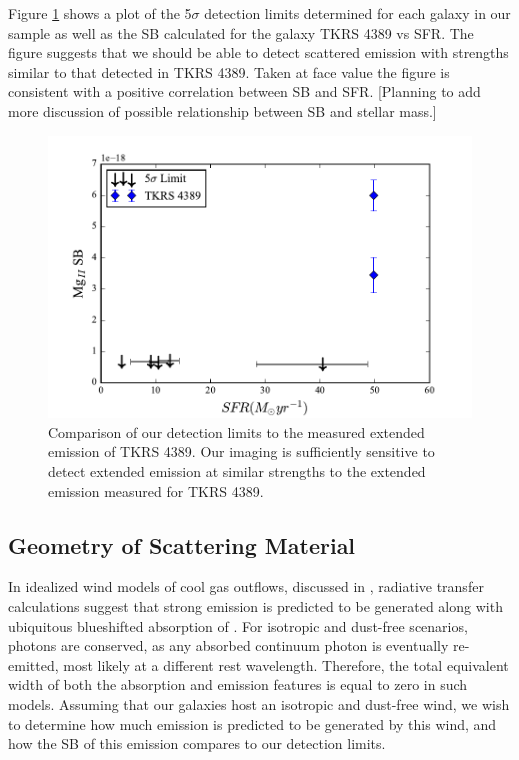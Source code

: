 \documentclass[twocolumn]{aastex61}
\begin{document}
Figure \ref{fig:detection_lim} shows a plot of the 5$\sigma$ detection limits determined for each galaxy in our sample as well as the SB calculated for the galaxy TKRS 4389 vs SFR. The figure suggests that we should be able to detect scattered  emission with strengths similar to that detected in TKRS 4389. Taken at face value the figure is consistent with a positive correlation between  SB and SFR. 
[Planning to add more discussion of possible relationship between SB and stellar mass.]


\begin{figure}[!htb]
\centering
\includegraphics[scale=0.6]{../Figures/limits.pdf}
\caption{Comparison of our detection limits to the measured extended emission of TKRS 4389. Our imaging is sufficiently sensitive to detect extended emission at similar strengths to the extended emission measured for TKRS 4389.}
\label{fig:detection_lim}
\end{figure}

\subsection{Geometry of Scattering Material}
In idealized wind models of cool gas outflows, discussed in \cite{Prochaska_2011}, radiative transfer calculations suggest that strong  emission is predicted to be generated along with ubiquitous blueshifted absorption of . For isotropic and dust-free scenarios, photons are conserved, as any absorbed continuum photon is eventually re-emitted, most likely at a different rest wavelength.  Therefore, the total equivalent width of both the absorption and emission features is equal to zero in such models. Assuming that our galaxies host an isotropic and dust-free wind, we wish to determine how much emission is predicted to be generated by this wind, and how the SB of this emission compares to our detection limits.
\end{document}
